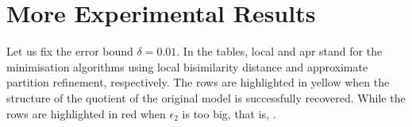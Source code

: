 %	
%	




\section{More Experimental Results}\label{appendix:more-results}

Let us fix the error bound $\delta = 0.01$. In the tables, local and apr stand for the minimisation algorithms using local bisimilarity distance and approximate partition refinement, respectively. The rows are highlighted in yellow when the structure of the quotient of the original model is successfully recovered. While the rows are highlighted in red when $\epsilon_2$ is too big, that is, . %

